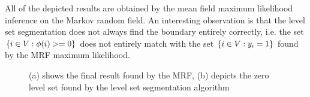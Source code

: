 \documentclass{article} %
\begin{document}
All of the depicted results are obtained by the mean field maximum likelihood inference on the Markov random field. An interesting observation is that the level set segmentation does not always find the boundary entirely correctly, i.e. the set $\{i\in V: \phi(i) >=0\}$  does not entirely match with the set $\{i\in V: y_i =1\}$ found by the MRF maximum likelihood. 
\begin{figure}[htbp]
\centering
{}
\caption{(a) shows the final result found by the MRF, (b) depicts the zero level set found by the level set segmentation algorithm}
\label{MRFvsCV}
\end{figure}
\end{document}
